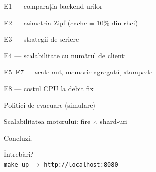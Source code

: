 \documentclass[aspectratio=169,11pt]{beamer}
\begin{document}
\begin{frame}{E1 — comparația backend-urilor}
  \centering\resizebox{0.95\linewidth}{!}{}
\end{frame}

\begin{frame}{E2 — asimetria Zipf (cache = 10\% din chei)}
  \centering\resizebox{0.95\linewidth}{!}{}
\end{frame}

\begin{frame}{E3 — strategii de scriere}
  \centering\resizebox{0.95\linewidth}{!}{}
\end{frame}

\begin{frame}{E4 — scalabilitate cu numărul de clienți}
  \centering\resizebox{0.95\linewidth}{!}{}
\end{frame}

\begin{frame}{E5–E7 — scale-out, memorie agregată, stampede}
  \centering\resizebox{0.98\linewidth}{!}{}
\end{frame}

\begin{frame}{E8 — costul CPU la debit fix}
  \centering\resizebox{0.95\linewidth}{!}{}
\end{frame}

\begin{frame}{Politici de evacuare (simulare)}
  \centering\resizebox{!}{0.85\textheight}{}
\end{frame}

\begin{frame}{Scalabilitatea motorului: fire × shard-uri}
  \centering\resizebox{0.95\linewidth}{!}{}
\end{frame}

\begin{frame}{Concluzii}
  
\end{frame}

\begin{frame}[standout]
  Întrebări?\\[4mm]
  \normalsize\texttt{make up} $\rightarrow$ \texttt{http://localhost:8080}
\end{frame}
\end{document}
